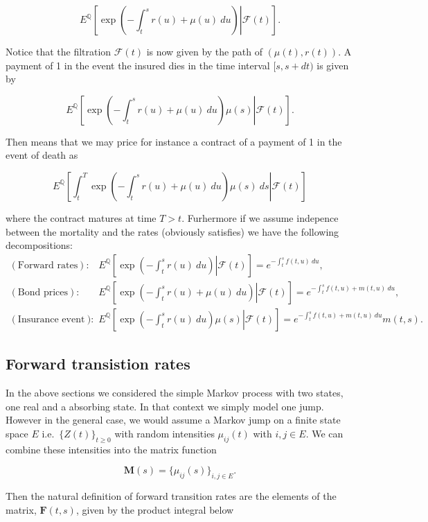 \documentclass[a4paper,12pt,openany]{book}
\begin{document}
\[
E^{\mathbb Q}\left[\left. \exp\left(-\int_t^sr(u)+\mu(u)\ du\right)\right\vert \mathcal F(t)\right].
\]

Notice that the filtration \(\mathcal F(t)\) is now given by the path of \((\mu(t),r(t))\). A payment of 1 in the event the insured dies in the time interval \([s,s+dt)\) is given by

\[
E^{\mathbb Q}\left[\left. \exp\left(-\int_t^sr(u)+\mu(u)\ du\right)\mu(s)\right\vert \mathcal F(t)\right].
\]

Then means that we may price for instance a contract of a payment of 1 in the event of death as

\[
E^{\mathbb Q}\left[\left. \int_t^T\exp\left(-\int_t^sr(u)+\mu(u)\ du\right)\mu(s)\ ds\right\vert \mathcal F(t)\right]
\]

where the contract matures at time \(T>t\). Furhermore if we assume indepence between the mortality and the rates (obviously satisfies) we have the following decompositions:
\begin{align*}
(\text{Forward rates}):\qquad& E^{\mathbb Q}\left[\left. \exp\left(-\int_t^sr(u)\ du\right)\right\vert \mathcal F(t)\right]=e^{-\int_t^sf(t,u)\ du},\\
(\text{Bond prices}):\qquad& E^{\mathbb Q}\left[\left. \exp\left(-\int_t^sr(u)+\mu(u)\ du\right)\right\vert \mathcal F(t)\right]=e^{-\int_t^sf(t,u)+m(t,u)\ du},\\
(\text{Insurance event}):\qquad& E^{\mathbb Q}\left[\left. \exp\left(-\int_t^sr(u)\ du\right)\mu(s)\right\vert \mathcal F(t)\right]=e^{-\int_t^sf(t,u)+m(t,u)\ du}m(t,s).
\end{align*}

\hypertarget{forward-transistion-rates}{%
\subsection{Forward transistion rates}\label{forward-transistion-rates}}

In the above sections we considered the simple Markov process with two states, one real and a absorbing state. In that context we simply model one jump. However in the general case, we would assume a Markov jump on a finite state space \(E\) i.e.~\(\{Z(t)\}_{t\ge 0}\) with random intensities \(\mu_{ij}(t)\) with \(i,j\in E\). We can combine these intensities into the matrix function

\[
\mathbf M(s)=\{\mu_{ij}(s)\}_{i,j\in E}.
\]

Then the natural definition of forward transition rates are the elements of the matrix, \(\mathbf F(t,s)\), given by the product integral below
\end{document}
